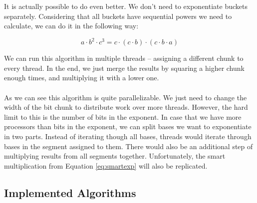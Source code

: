 It is actually possible to do even better. We don't need to exponentiate buckets separately. Considering that all buckets have sequential powers we need to calculate, we can do it in the following way:

\begin{equation}
    \label{eq:smartexp}
    a \cdot b^2 \cdot c^3 = c \cdot (c \cdot b) \cdot (c \cdot b \cdot a)
\end{equation}

\noindent We can run this algorithm in multiple threads -- assigning a different chunk to every thread. In the end, we just merge the results by squaring a higher chunk enough times, and multiplying it with a lower one.\\
\\
As we can see this algorithm is quite parallelizable. We just need to change the width of the bit chunk to distribute work over more threads. However, the hard limit to this is the number of bits in the exponent. In case that we have more processors than bits in the exponent, we can split bases we want to exponentiate in two parts. Instead of iterating though all bases, threads would iterate through bases in the segment assigned to them. There would also be an additional step of multiplying results from all segments together. Unfortunately, the smart multiplication from Equation \ref{eq:smartexp} will also be replicated.
\\
\subsection{Implemented Algorithms}


